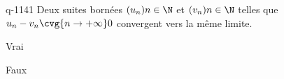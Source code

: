 \begin{truefalse}{q-1141}
Deux suites bornées $(u_n){n\in\N}$ et $(v_n){n\in\N}$ telles que $u_n-v_n \cvg{n\to+\infty}  0$ convergent vers la même limite.
\item Vrai
\item* Faux
\end{truefalse}

